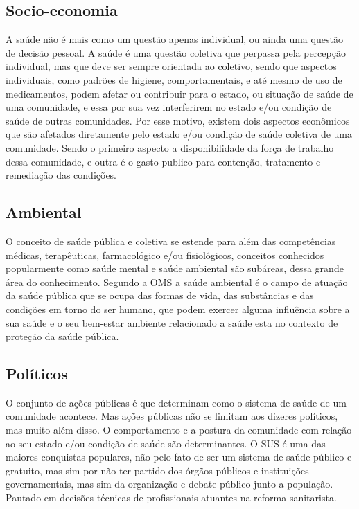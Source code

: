 \documentclass[journal]{IEEEtran}
\begin{document}
\subsection{Socio-economia}
A saúde não é mais como um questão apenas individual, ou ainda uma questão de decisão pessoal. A saúde é uma questão coletiva \cite{saude_coletiva} que perpassa pela percepção individual, mas que deve ser sempre orientada ao coletivo, sendo que aspectos individuais, como padrões de higiene, comportamentais, e até mesmo de uso de medicamentos, podem afetar ou contribuir para o estado, ou situação de saúde de uma comunidade, e essa por sua vez interferirem no estado e/ou condição de saúde de outras comunidades.
Por esse motivo, existem dois aspectos econômicos \cite{saude_forca_trabalho} que são afetados diretamente pelo estado e/ou condição de saúde coletiva de uma comunidade. Sendo o primeiro aspecto a disponibilidade da força de trabalho dessa comunidade, e outra é o gasto publico para contenção, tratamento e remediação das condições.
\subsection{Ambiental}
O conceito de saúde pública e coletiva se estende para além das competências médicas, terapêuticas, farmacológico e/ou fisiológicos, conceitos conhecidos popularmente como saúde mental e saúde ambiental são subáreas, dessa grande área do conhecimento.
Segundo a OMS a saúde ambiental é o campo de atuação da saúde pública que se ocupa das formas de vida, das substâncias e das condições em torno do ser humano, que podem exercer alguma influência sobre a sua saúde e o seu bem-estar \cite{ms_oms} ambiente relacionado a saúde esta no contexto de proteção da saúde pública. 
\subsection{Políticos}
O conjunto de ações públicas é que determinam como o sistema de saúde de um comunidade acontece. Mas ações públicas não se limitam aos dizeres políticos, mas muito além disso. O comportamento e a postura da comunidade com relação ao seu estado e/ou condição de saúde são determinantes. 
O SUS é uma das maiores conquistas populares, não pelo fato de ser um sistema de saúde público e gratuito, mas sim por não ter partido dos órgãos públicos e instituições governamentais, mas sim  da organização e debate público junto a população. Pautado em decisões técnicas de profissionais atuantes na reforma sanitarista. \cite{o_que_e_sus}
\end{document}
